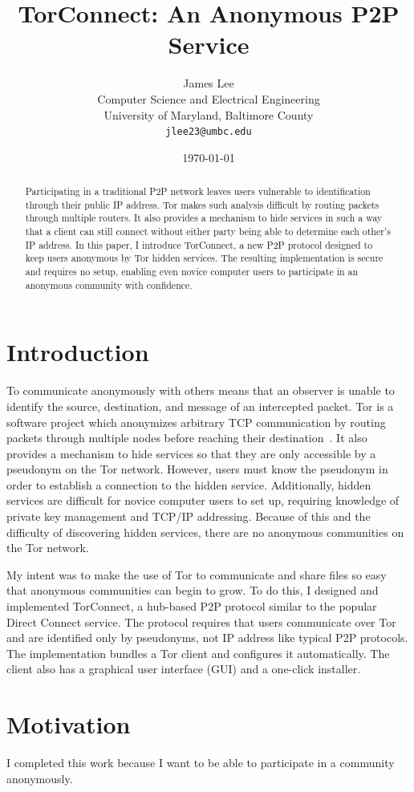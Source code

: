 \documentclass{article}
\title{TorConnect: An Anonymous P2P Service}
\author{James Lee\\
	\small Computer Science and Electrical Engineering\\
	\small University of Maryland, Baltimore County\\
	\small\tt jlee23@umbc.edu}
\date{\today}
\begin{document}
\maketitle
\begin{abstract}
Participating in a traditional P2P network leaves users vulnerable to identification through their public IP address.  Tor makes such analysis difficult by routing packets through multiple routers.  It also provides a mechanism to hide services in such a way that a client can still connect without either party being able to determine each other's IP address.  In this paper, I introduce TorConnect, a new P2P protocol designed to keep users anonymous by Tor hidden services.  The resulting implementation is secure and requires no setup, enabling even novice computer users to participate in an anonymous community with confidence.
\end{abstract}

\section{Introduction}
To communicate anonymously with others means that an observer is unable to identify the source, destination, and message of an intercepted packet.  Tor is a software project which anonymizes arbitrary TCP communication by routing packets through multiple nodes before reaching their destination~\cite{tor-design}.  It also provides a mechanism to hide services so that they are only accessible by a pseudonym on the Tor network.  However, users must know the pseudonym in order to establish a connection to the hidden service.  Additionally, hidden services are difficult for novice computer users to set up, requiring knowledge of private key management and TCP/IP addressing.  Because of this and the difficulty of discovering hidden services, there are no anonymous communities on the Tor network.

My intent was to make the use of Tor to communicate and share files so easy that anonymous communities can begin to grow.  To do this, I designed and implemented TorConnect, a hub-based P2P protocol similar to the popular Direct Connect service.  The protocol requires that users communicate over Tor and are identified only by pseudonyms, not IP address like typical P2P protocols.  The implementation bundles a Tor client and configures it automatically.  The client also has a graphical user interface (GUI) and a one-click installer.

\section{Motivation}
I completed this work because I want to be able to participate in a community anonymously.
\end{document}
